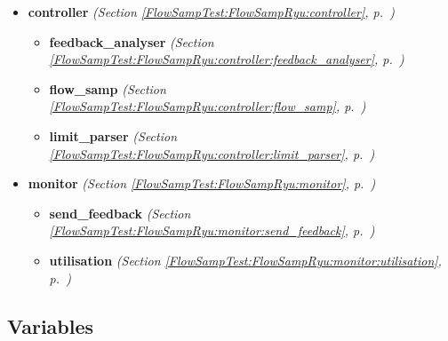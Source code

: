\begin{itemize}
\setlength{\parskip}{0ex}
\item \textbf{controller}
  \textit{(Section \ref{FlowSampTest:FlowSampRyu:controller}, p.~\pageref{FlowSampTest:FlowSampRyu:controller})}

  \begin{itemize}
\setlength{\parskip}{0ex}
    \item \textbf{feedback\_analyser}
  \textit{(Section \ref{FlowSampTest:FlowSampRyu:controller:feedback_analyser}, p.~\pageref{FlowSampTest:FlowSampRyu:controller:feedback_analyser})}

    \item \textbf{flow\_samp}
  \textit{(Section \ref{FlowSampTest:FlowSampRyu:controller:flow_samp}, p.~\pageref{FlowSampTest:FlowSampRyu:controller:flow_samp})}

    \item \textbf{limit\_parser}
  \textit{(Section \ref{FlowSampTest:FlowSampRyu:controller:limit_parser}, p.~\pageref{FlowSampTest:FlowSampRyu:controller:limit_parser})}

  \end{itemize}
\item \textbf{monitor}
  \textit{(Section \ref{FlowSampTest:FlowSampRyu:monitor}, p.~\pageref{FlowSampTest:FlowSampRyu:monitor})}

  \begin{itemize}
\setlength{\parskip}{0ex}
    \item \textbf{send\_feedback}
  \textit{(Section \ref{FlowSampTest:FlowSampRyu:monitor:send_feedback}, p.~\pageref{FlowSampTest:FlowSampRyu:monitor:send_feedback})}

    \item \textbf{utilisation}
  \textit{(Section \ref{FlowSampTest:FlowSampRyu:monitor:utilisation}, p.~\pageref{FlowSampTest:FlowSampRyu:monitor:utilisation})}

  \end{itemize}
\end{itemize}



  \subsection{Variables}

